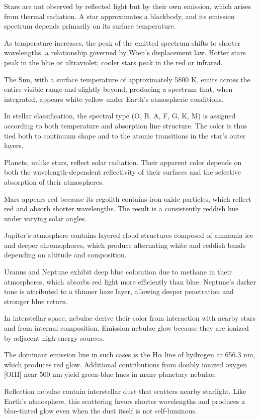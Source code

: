 Stars are not observed by reflected light but by their own emission, which arises from thermal radiation. A star approximates a blackbody, and its emission spectrum depends primarily on its surface temperature.

As temperature increases, the peak of the emitted spectrum shifts to shorter wavelengths, a relationship governed by Wien’s displacement law. Hotter stars peak in the blue or ultraviolet; cooler stars peak in the red or infrared.

The Sun, with a surface temperature of approximately 5800 K, emits across the entire visible range and slightly beyond, producing a spectrum that, when integrated, appears white-yellow under Earth's atmospheric conditions.

In stellar classification, the spectral type (O, B, A, F, G, K, M) is assigned according to both temperature and absorption line structure. The color is thus tied both to continuum shape and to the atomic transitions in the star’s outer layers.

Planets, unlike stars, reflect solar radiation. Their apparent color depends on both the wavelength-dependent reflectivity of their surfaces and the selective absorption of their atmospheres.

Mars appears red because its regolith contains iron oxide particles, which reflect red and absorb shorter wavelengths. The result is a consistently reddish hue under varying solar angles.

Jupiter’s atmosphere contains layered cloud structures composed of ammonia ice and deeper chromophores, which produce alternating white and reddish bands depending on altitude and composition.

Uranus and Neptune exhibit deep blue coloration due to methane in their atmospheres, which absorbs red light more efficiently than blue. Neptune’s darker tone is attributed to a thinner haze layer, allowing deeper penetration and stronger blue return.

In interstellar space, nebulae derive their color from interaction with nearby stars and from internal composition. Emission nebulae glow because they are ionized by adjacent high-energy sources.

The dominant emission line in such cases is the H$\alpha$ line of hydrogen at 656.3 nm, which produces red glow. Additional contributions from doubly ionized oxygen [OIII] near 500 nm yield green-blue hues in many planetary nebulae.

Reflection nebulae contain interstellar dust that scatters nearby starlight. Like Earth’s atmosphere, this scattering favors shorter wavelengths and produces a blue-tinted glow even when the dust itself is not self-luminous.

